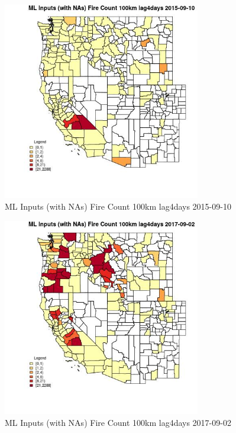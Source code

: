 \begin{figure} 
\centering  
\includegraphics[width=0.77\textwidth]{Code_Outputs/Report_ML_input_PM25_Step4_part_e_de_duplicated_aves_compiled_2019-05-21wNAs_CountyFire_Count_100km_lag4daysMean2015-09-10.jpg} 
\caption{\label{fig:Report_ML_input_PM25_Step4_part_e_de_duplicated_aves_compiled_2019-05-21wNAsCountyFire_Count_100km_lag4daysMean2015-09-10}ML Inputs (with NAs) Fire Count 100km lag4days 2015-09-10} 
\end{figure} 
 

\clearpage 

\begin{figure} 
\centering  
\includegraphics[width=0.77\textwidth]{Code_Outputs/Report_ML_input_PM25_Step4_part_e_de_duplicated_aves_compiled_2019-05-21wNAs_CountyFire_Count_100km_lag4daysMean2017-09-02.jpg} 
\caption{\label{fig:Report_ML_input_PM25_Step4_part_e_de_duplicated_aves_compiled_2019-05-21wNAsCountyFire_Count_100km_lag4daysMean2017-09-02}ML Inputs (with NAs) Fire Count 100km lag4days 2017-09-02} 
\end{figure} 
 

